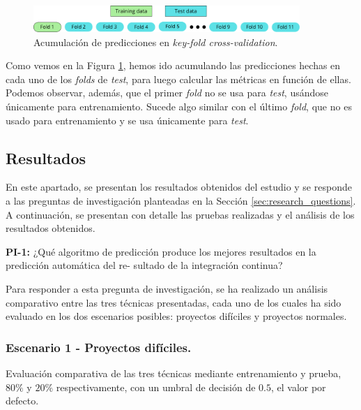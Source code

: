 \begin{figure}[H]
    \centering
    \includegraphics[width=0.9\textwidth]{images/Folds predictions.pdf}
    \caption{Acumulación de predicciones en \textit{key-fold cross-validation}.}
    \label{fig:fold-predictions}
\end{figure}

Como vemos en la Figura \ref{fig:fold-predictions}, hemos ido acumulando las predicciones hechas
en cada uno de los \textit{folds} de \textit{test}, para luego calcular las métricas en función
de ellas. Podemos observar, además, que el primer \textit{fold} no se usa para \textit{test},
usándose únicamente para entrenamiento. Sucede algo similar con el último \textit{fold}, que no
es usado para entrenamiento y se usa únicamente para \textit{test}.\\

\subsection{Resultados}
En este apartado, se presentan los resultados obtenidos del estudio y se responde a las
preguntas de investigación planteadas en la Sección \ref{sec:research_questions}. A continuación,
se presentan con detalle las pruebas realizadas y el análisis de los resultados obtenidos.\\

\begin{mdframed}[backgroundcolor=gray!10,linewidth=0.5pt,roundcorner=1pt]
    \textbf{PI-1:} ¿Qué algoritmo de predicción produce los mejores resultados en la predicción automática del re-
    sultado de la integración continua?
\end{mdframed}

Para responder a esta pregunta de investigación, se ha realizado un análisis comparativo entre
las tres técnicas presentadas, cada uno de los cuales ha sido evaluado en los dos escenarios
posibles: proyectos difíciles y proyectos normales. 

\subsubsection{Escenario 1 - Proyectos difíciles.} Evaluación comparativa de las tres técnicas
mediante entrenamiento y prueba, $80\%$ y $20\%$ respectivamente, con un umbral de decisión
de $0.5$, el valor por defecto.\\

